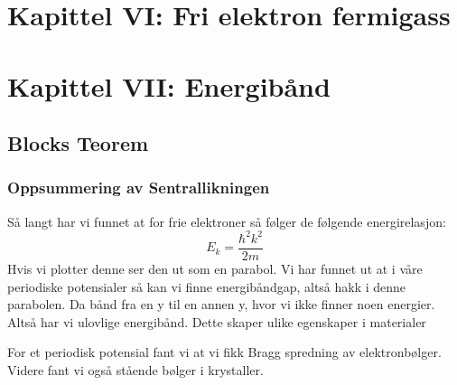 \documentclass{article}
\begin{document}
\section{Kapittel VI: Fri elektron fermigass }
\newpage
\section{Kapittel VII: Energibånd }
\subsection{Blocks Teorem}
\subsubsection{Oppsummering av Sentrallikningen}
Så langt har vi funnet at for frie elektroner så følger de følgende energirelasjon:
\begin{equation}
  \label{eq:energi_for_frie_elektroner}
  E_k = \frac{\hbar^2 k^2}{2m}
\end{equation}
Hvis vi plotter denne ser den ut som en parabol. Vi har funnet ut at i våre periodiske potensialer så kan vi finne energibåndgap, altså hakk i denne parabolen. Da bånd fra en y til en annen y, hvor vi ikke finner noen energier. Altså har vi ulovlige energibånd. Dette skaper ulike egenskaper i materialer %

For et periodisk potensial fant vi at vi fikk Bragg spredning av elektronbølger. Videre fant vi også stående bølger i krystaller.
\end{document}
